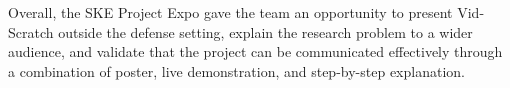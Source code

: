 Overall, the SKE Project Expo gave the team an opportunity to present
Vid-Scratch outside the defense setting, explain the research problem
to a wider audience, and validate that the project can be communicated
effectively through a combination of poster, live demonstration, and
step-by-step explanation.

\makeatletter
\renewcommand\section{\@startsection {section}{1}{\z@}%
                                   {-3.5ex \@plus -1ex \@minus -.2ex}%
                                   {2.3ex \@plus.2ex}%
                                   {\normalfont\moderate\bfseries}}
\renewcommand\subsection{\@startsection{subsection}{2}{\z@}%
                                     {-3.25ex\@plus -1ex \@minus -.2ex}%
                                     {1.5ex \@plus .2ex}%
                                     {\normalfont\normalsize\bfseries\leftskip 40pt}}
\makeatother

\flushbottom
